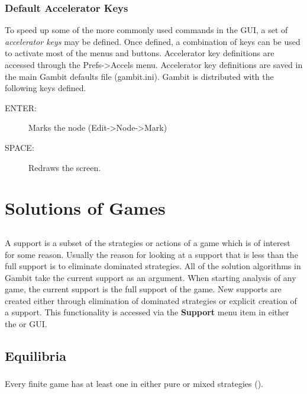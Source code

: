 \subsection{Default Accelerator Keys}\label{ExtFormDefAccl}
To speed up some of the more commonly used commands in the GUI, a set of
{\em accelerator keys} may be defined.  Once defined, a combination of keys
can be used to activate most of the menus and buttons.  Accelerator key
definitions are accessed through the Prefs->Accels menu.  Accelerator key
definitions are saved in the main Gambit defaults file (gambit.ini).  Gambit
is distributed with the following keys defined.
\begin{description}
\item[ENTER:] Marks the node (Edit->Node->Mark)
\item[SPACE:] Redraws the screen.  
\end{description}

\chapter{Solutions of Games}

\section{}\label{supportsec}

A support is a subset of the strategies or actions of a game which is
of interest for some reason.  Usually the reason for looking at a
support that is less than the full support is to eliminate dominated
strategies.  All of the solution algorithms in Gambit take the current
support as an argument.  When starting analysis of any game, the
current support is the full support of the game.  New supports are
created either through elimination of dominated strategies or explicit
creation of a support.  This functionality is accessed via the {\bf
Support} menu item in either the  or
 GUI.

\section{Equilibria}

\subsection{}\label{nashsec}
Every finite game has at least one  in either pure or mixed strategies
(\cite{Nash:1950}).

